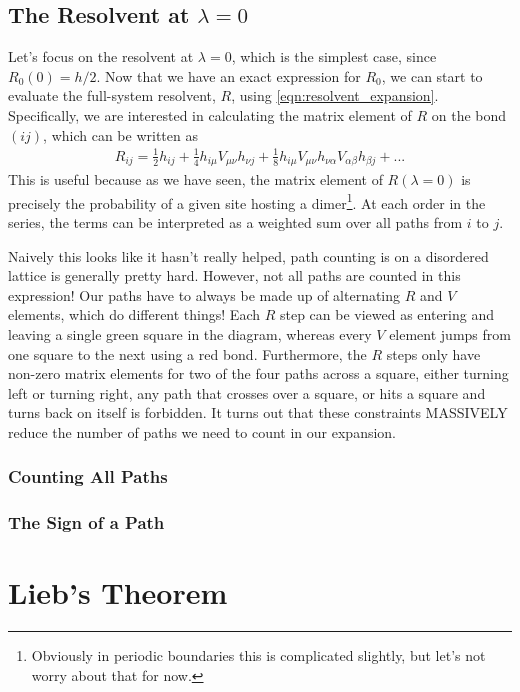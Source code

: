 \documentclass[11pt, oneside]{article} %
\numberwithin{equation}{section}
\begin{document}
\subsection{The Resolvent at $\lambda = 0$}

Let's focus on the resolvent at $\lambda = 0$, which is the simplest case, since $R_0(0) = h/2$.
Now that we have an exact expression for $R_0$, we can start to evaluate the full-system resolvent, $R$, using \cref{eqn:resolvent_expansion}. Specifically, we are interested in calculating the matrix element of $R$ on the bond $(ij)$, which can be written as
\begin{align}
    R_{ij} = \frac 12 h_{ij} + \frac 14 h_{ i\mu} V_{\mu \nu}h_{ \nu j} +\frac 18 h_{ i\mu} V_{\mu \nu} h_{ \nu\alpha} V_{\alpha \beta}h_{ \beta j} + ...
\end{align}
This is useful because as we have seen, the matrix element of $R(\lambda = 0)$ is precisely the probability of a given site hosting a dimer\footnote{Obviously in periodic boundaries this is complicated slightly, but let's not worry about that for now.}. At each order in the series, the terms can be interpreted as a weighted sum over all paths from $i$ to $j$. 

Naively this looks like it hasn't really helped, path counting is on a disordered lattice is generally pretty hard. However, not all paths are counted in this expression! Our paths have to always be made up of alternating $R$ and $V$ elements, which do different things! Each $R$ step can be viewed as entering and leaving a single green square in the diagram, whereas every $V$ element jumps from one square to the next using a red bond. Furthermore, the $R$ steps only have non-zero matrix elements for two of the four paths across a square, either turning left or turning right, any path that crosses over a square, or hits a square and turns back on itself is forbidden. It turns out that these constraints MASSIVELY reduce the number of paths we need to count in our expansion.

\subsubsection{Counting All Paths}
\subsubsection{The Sign of a Path}

\section{Lieb's Theorem}
\end{document}
